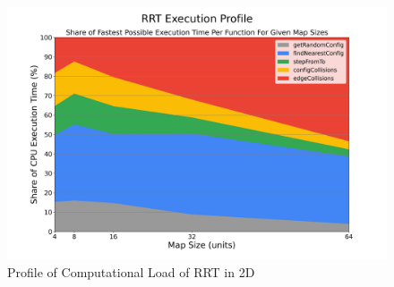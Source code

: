 \begin{figure}[H]
\begin{center}
    \includegraphics[width=\linewidth]{chapters/chapter2/img/profiling/profile2d.png}
    \caption{Profile of Computational Load of \gls{RRT} in 2D}
    \label{fig:rrt_profiling_2d}
\end{center}
\end{figure}